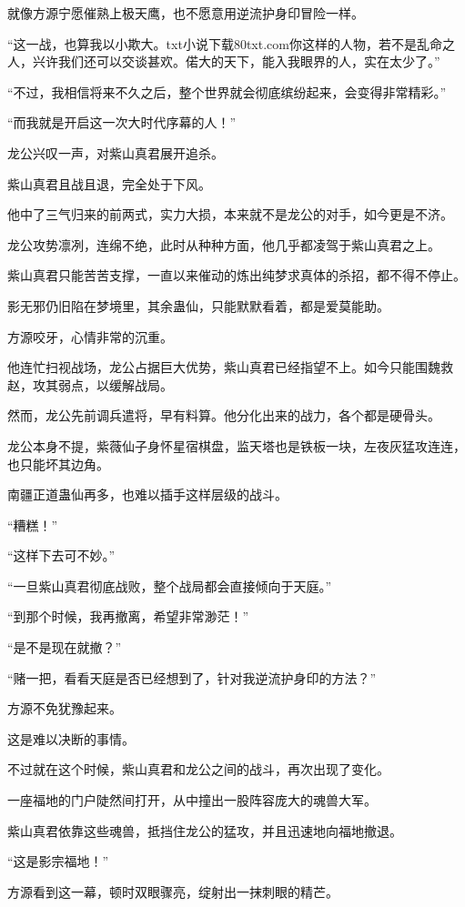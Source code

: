 \begin{this_body}
就像方源宁愿催熟上极天鹰，也不愿意用逆流护身印冒险一样。

“这一战，也算我以小欺大。txt小说下载80txt.com你这样的人物，若不是乱命之人，兴许我们还可以交谈甚欢。偌大的天下，能入我眼界的人，实在太少了。”

“不过，我相信将来不久之后，整个世界就会彻底缤纷起来，会变得非常精彩。”

“而我就是开启这一次大时代序幕的人！”

龙公兴叹一声，对紫山真君展开追杀。

紫山真君且战且退，完全处于下风。

他中了三气归来的前两式，实力大损，本来就不是龙公的对手，如今更是不济。

龙公攻势凛冽，连绵不绝，此时从种种方面，他几乎都凌驾于紫山真君之上。

紫山真君只能苦苦支撑，一直以来催动的炼出纯梦求真体的杀招，都不得不停止。

影无邪仍旧陷在梦境里，其余蛊仙，只能默默看着，都是爱莫能助。

方源咬牙，心情非常的沉重。

他连忙扫视战场，龙公占据巨大优势，紫山真君已经指望不上。如今只能围魏救赵，攻其弱点，以缓解战局。

然而，龙公先前调兵遣将，早有料算。他分化出来的战力，各个都是硬骨头。

龙公本身不提，紫薇仙子身怀星宿棋盘，监天塔也是铁板一块，左夜灰猛攻连连，也只能坏其边角。

南疆正道蛊仙再多，也难以插手这样层级的战斗。

“糟糕！”

“这样下去可不妙。”

“一旦紫山真君彻底战败，整个战局都会直接倾向于天庭。”

“到那个时候，我再撤离，希望非常渺茫！”

“是不是现在就撤？”

“赌一把，看看天庭是否已经想到了，针对我逆流护身印的方法？”

方源不免犹豫起来。

这是难以决断的事情。

不过就在这个时候，紫山真君和龙公之间的战斗，再次出现了变化。

一座福地的门户陡然间打开，从中撞出一股阵容庞大的魂兽大军。

紫山真君依靠这些魂兽，抵挡住龙公的猛攻，并且迅速地向福地撤退。

“这是影宗福地！”

方源看到这一幕，顿时双眼骤亮，绽射出一抹刺眼的精芒。


\end{this_body}
